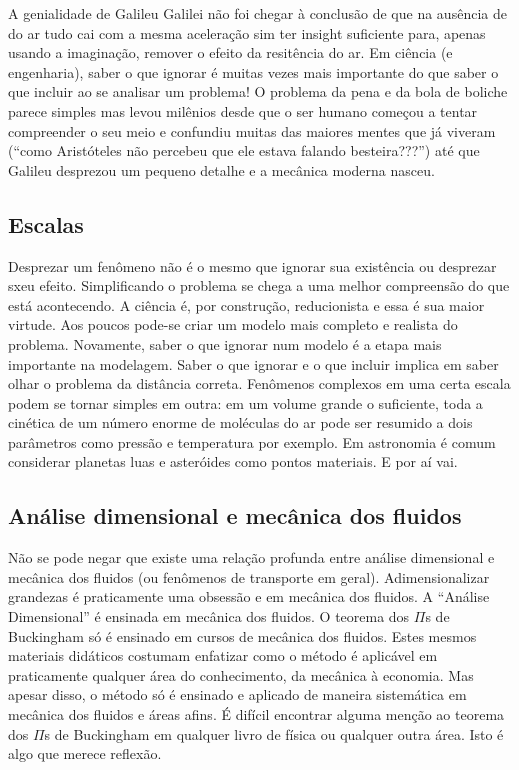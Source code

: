 \documentclass[article,12pt,oneside,a4paper,english,brazil,sumario=tradicional]{abntex2}
\begin{document}
A genialidade de Galileu Galilei não foi chegar à conclusão de que na ausência de do ar tudo cai com a mesma aceleração sim ter insight suficiente para, apenas usando a imaginação, remover o efeito da resitência do ar. Em ciência (e engenharia), saber o que ignorar é muitas vezes mais importante do que saber o que incluir ao se analisar um problema! O problema da pena e da bola de boliche parece simples mas levou milênios desde que o ser humano começou a tentar compreender o seu meio e confundiu muitas das maiores mentes que já viveram (``como Aristóteles não percebeu que ele estava falando besteira???'') até que Galileu desprezou um pequeno detalhe e a mecânica moderna nasceu. 



\subsection{Escalas}
Desprezar um fenômeno não é o mesmo que ignorar sua existência ou desprezar sxeu efeito. Simplificando o problema se chega a uma melhor compreensão do que está acontecendo. A ciência é, por construção, reducionista e essa é sua maior virtude. Aos poucos pode-se criar um modelo mais completo e realista do problema. Novamente, saber o que ignorar num modelo é a etapa mais importante na modelagem. Saber o que ignorar e o que incluir implica em saber olhar o problema da distância correta. Fenômenos complexos em uma certa escala podem se tornar simples em outra: em um volume grande o suficiente, toda a cinética  de um número enorme de moléculas do ar pode ser resumido a dois parâmetros como pressão e temperatura por exemplo. Em astronomia é comum considerar planetas luas e asteróides como pontos materiais. E por aí vai.


\subsection{Análise dimensional e mecânica dos fluidos}

Não se pode negar que existe uma relação profunda entre análise dimensional e mecânica dos fluidos (ou fenômenos de transporte em geral). Adimensionalizar grandezas é praticamente uma obsessão e em mecânica dos fluidos.  A ``Análise Dimensional'' é ensinada em mecânica dos fluidos. O teorema dos $\Pi$s de Buckingham só é ensinado em cursos de mecânica dos fluidos. Estes mesmos materiais didáticos costumam enfatizar como o método é aplicável em praticamente qualquer área do conhecimento, da mecânica à economia. Mas apesar disso, o método só é ensinado e aplicado de maneira sistemática em mecânica dos fluidos e áreas afins. É difícil encontrar alguma menção ao teorema dos $\Pi$s de Buckingham em qualquer livro de física ou qualquer outra área. Isto  é algo que merece reflexão.
\end{document}

